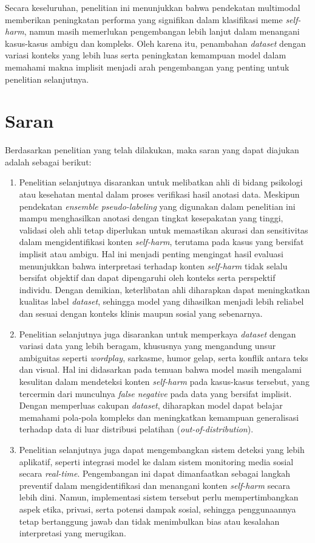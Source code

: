 Secara keseluruhan, penelitian ini menunjukkan bahwa pendekatan multimodal memberikan peningkatan performa yang signifikan dalam klasifikasi meme \textit{self-harm}, namun masih memerlukan pengembangan lebih lanjut dalam menangani kasus-kasus ambigu dan kompleks. Oleh karena itu, penambahan \textit{dataset} dengan variasi konteks yang lebih luas serta peningkatan kemampuan model dalam memahami makna implisit menjadi arah pengembangan yang penting untuk penelitian selanjutnya.


\section{Saran} \label{V.Saran}
Berdasarkan penelitian yang telah dilakukan, maka saran yang dapat diajukan adalah sebagai berikut:

\begin{enumerate}
    \item Penelitian selanjutnya disarankan untuk melibatkan ahli di bidang psikologi atau kesehatan mental dalam proses verifikasi hasil anotasi data. Meskipun pendekatan \textit{ensemble pseudo-labeling} yang digunakan dalam penelitian ini mampu menghasilkan anotasi dengan tingkat kesepakatan yang tinggi, validasi oleh ahli tetap diperlukan untuk memastikan akurasi dan sensitivitas dalam mengidentifikasi konten \textit{self-harm}, terutama pada kasus yang bersifat implisit atau ambigu. Hal ini menjadi penting mengingat hasil evaluasi menunjukkan bahwa interpretasi terhadap konten \textit{self-harm} tidak selalu bersifat objektif dan dapat dipengaruhi oleh konteks serta perspektif individu. Dengan demikian, keterlibatan ahli diharapkan dapat meningkatkan kualitas label \textit{dataset}, sehingga model yang dihasilkan menjadi lebih reliabel dan sesuai dengan konteks klinis maupun sosial yang sebenarnya.

    \item Penelitian selanjutnya juga disarankan untuk memperkaya \textit{dataset} dengan variasi data yang lebih beragam, khususnya yang mengandung unsur ambiguitas seperti \textit{wordplay}, sarkasme, humor gelap, serta konflik antara teks dan visual. Hal ini didasarkan pada temuan bahwa model masih mengalami kesulitan dalam mendeteksi konten \textit{self-harm} pada kasus-kasus tersebut, yang tercermin dari munculnya \textit{false negative} pada data yang bersifat implisit. Dengan memperluas cakupan \textit{dataset}, diharapkan model dapat belajar memahami pola-pola kompleks dan meningkatkan kemampuan generalisasi terhadap data di luar distribusi pelatihan (\textit{out-of-distribution}).

    \item Penelitian selanjutnya juga dapat mengembangkan sistem deteksi yang lebih aplikatif, seperti integrasi model ke dalam sistem monitoring media sosial secara \textit{real-time}. Pengembangan ini dapat dimanfaatkan sebagai langkah preventif dalam mengidentifikasi dan menangani konten \textit{self-harm} secara lebih dini. Namun, implementasi sistem tersebut perlu mempertimbangkan aspek etika, privasi, serta potensi dampak sosial, sehingga penggunaannya tetap bertanggung jawab dan tidak menimbulkan bias atau kesalahan interpretasi yang merugikan.
\end{enumerate}

